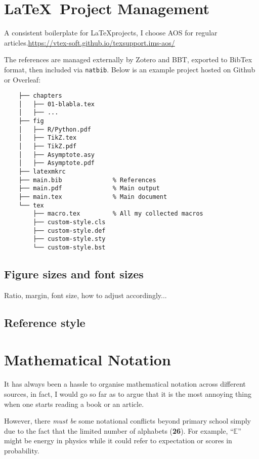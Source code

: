 \newpage


\section{\LaTeX\ Project Management}

A consistent boilerplate for \LaTeX projects,
I choose AOS for regular articles.\url{https://vtex-soft.github.io/texsupport.ims-aos/}

The references are managed externally by Zotero and BBT,
exported to BibTex format,
then included via \verb|natbib|.
Below is an example project hosted on Github or Overleaf:

\begin{Verbatim}
    ├── chapters
    │   ├── 01-blabla.tex
    │   ├── ...
    ├── fig
    │   ├── R/Python.pdf
    │   ├── TikZ.tex
    │   ├── TikZ.pdf
    │   ├── Asymptote.asy
    │   ├── Asymptote.pdf
    ├── latexmkrc
    ├── main.bib              % References
    ├── main.pdf              % Main output
    ├── main.tex              % Main document
    └── tex
        ├── macro.tex         % All my collected macros
        ├── custom-style.cls
        ├── custom-style.def
        ├── custom-style.sty
        └── custom-style.bst
\end{Verbatim}

\subsection{Figure sizes and font sizes}

Ratio, margin, font size, how to adjust accordingly...

\subsection{Reference style}

\newpage

\section{Mathematical Notation}

It has always been a hassle to organise mathematical notation across different sources,
in fact, I would go so far as to argue that it is the most annoying thing
when one starts reading a book or an article.

However, there \textit{must be} some notational conflicts beyond primary school
simply due to the fact that the limited number of alphabets (\textbf{26}).
For example, ``$\mathbb{E}$'' might be energy in physics
while it could refer to expectation or scores in probability.

